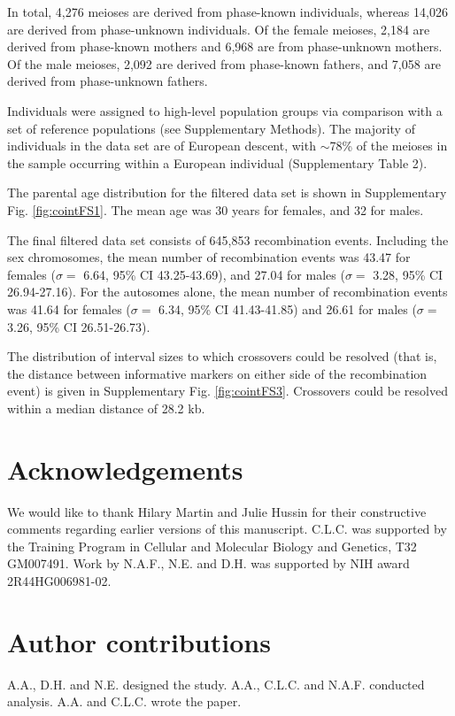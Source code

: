 In total, 4,276 meioses are derived from phase-known individuals, whereas
14,026 are derived from phase-unknown individuals. Of the female meioses, 2,184
are derived from phase-known mothers and 6,968 are from phase-unknown
mothers. Of the male meioses, 2,092 are derived from phase-known fathers, and
7,058 are derived from phase-unknown fathers.

Individuals were assigned to high-level population groups via comparison with
a set of reference populations (see Supplementary Methods). The majority of
individuals in the data set are of European descent, with $\sim$78\% of the meioses in
the sample occurring within a European individual (Supplementary Table 2).

The parental age distribution for the filtered data set is shown in Supplementary
Fig. \ref{fig:cointFS1}. The mean age was 30 years for females, and 32 for males.

The final filtered data set consists of 645,853 recombination events. Including
the sex chromosomes, the mean number of recombination events was 43.47 for
females ($\sigma=$ 6.64, 95\% CI 43.25-43.69), and 27.04 for males ($\sigma=$ 3.28, 95\% CI
26.94-27.16). For the autosomes alone, the mean number of recombination events
was 41.64 for females ($\sigma=$ 6.34, 95\% CI 41.43-41.85) and 26.61 for males
($\sigma=$ 3.26, 95\% CI 26.51-26.73).

The distribution of interval sizes to which crossovers could be resolved (that is,
the distance between informative markers on either side of the recombination
event) is given in Supplementary Fig. \ref{fig:cointFS3}. Crossovers could be resolved within a
median distance of 28.2 kb.

\section{Acknowledgements}
We would like to thank Hilary Martin and Julie Hussin for their constructive comments
regarding earlier versions of this manuscript. C.L.C. was supported by the Training
Program in Cellular and Molecular Biology and Genetics, T32 GM007491. Work by
N.A.F., N.E. and D.H. was supported by NIH award 2R44HG006981-02.

\section{Author contributions}
A.A., D.H. and N.E. designed the study. A.A., C.L.C. and N.A.F. conducted analysis.
A.A. and C.L.C. wrote the paper.

